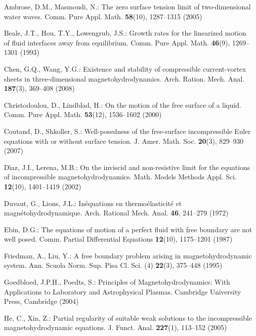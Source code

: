 \documentclass[12pt,reqno]{amsart}
\numberwithin{equation}{section}
\theoremstyle{definition}
\theoremstyle{remark}
\begin{document}
\begin{thebibliography}{10}

Ambrose, D.M., Masmoudi, N.: The zero surface tension limit of two-dimensional
  water waves.
\newblock Comm. Pure Appl. Math. \textbf{58}(10), 1287--1315 (2005)

Beale, J.T., Hou, T.Y., Lowengrub, J.S.: Growth rates for the linearized motion
  of fluid interfaces away from equilibrium.
\newblock Comm. Pure Appl. Math. \textbf{46}(9), 1269--1301 (1993)

Chen, G.Q., Wang, Y.G.: Existence and stability of compressible current-vortex
  sheets in three-dimensional magnetohydrodynamics.
\newblock Arch. Ration. Mech. Anal. \textbf{187}(3), 369--408 (2008)

Christodoulou, D., Lindblad, H.: On the motion of the free surface of a liquid.
\newblock Comm. Pure Appl. Math. \textbf{53}(12), 1536--1602 (2000)

Coutand, D., Shkoller, S.: Well-posedness of the free-surface incompressible
  {E}uler equations with or without surface tension.
\newblock J. Amer. Math. Soc. \textbf{20}(3), 829--930 (2007)

D{\'{\i}}az, J.I., Lerena, M.B.: On the inviscid and non-resistive limit for
  the equations of incompressible magnetohydrodynamics.
\newblock Math. Models Methods Appl. Sci. \textbf{12}(10), 1401--1419 (2002)

Duvaut, G., Lions, J.L.: In\'equations en thermo\'elasticit\'e et
  magn\'etohydrodynamique.
\newblock Arch. Rational Mech. Anal. \textbf{46}, 241--279 (1972)

Ebin, D.G.: The equations of motion of a perfect fluid with free boundary are
  not well posed.
\newblock Comm. Partial Differential Equations \textbf{12}(10), 1175--1201
  (1987)

Friedman, A., Liu, Y.: A free boundary problem arising in magnetohydrodynamic
  system.
\newblock Ann. Scuola Norm. Sup. Pisa Cl. Sci. (4) \textbf{22}(3), 375--448
  (1995)

Goedbloed, J.P.H., Poedts, S.: Principles of Magnetohydrodynamics: With
  Applications to Laboratory and Astrophysical Plasmas.
\newblock Cambridge University Press, Cambridge (2004)

He, C., Xin, Z.: Partial regularity of suitable weak solutions to the
  incompressible magnetohydrodynamic equations.
\newblock J. Funct. Anal. \textbf{227}(1), 113--152 (2005)


\end{thebibliography}
\end{document}
